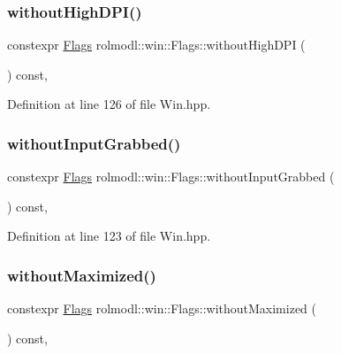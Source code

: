 \subsubsection{\texorpdfstring{withoutHighDPI()}{withoutHighDPI()}}
{\footnotesize\ttfamily constexpr \mbox{\hyperlink{structrolmodl_1_1win_1_1_flags}{Flags}} rolmodl\+::win\+::\+Flags\+::without\+High\+D\+PI (\begin{DoxyParamCaption}{ }\end{DoxyParamCaption}) const\hspace{0.3cm}{\ttfamily [inline]}, {\ttfamily [noexcept]}}



Definition at line 126 of file Win.\+hpp.

\mbox{\label{structrolmodl_1_1win_1_1_flags_a2e21e22deaf66fbd81b3f447df8f5668}} 
\subsubsection{\texorpdfstring{withoutInputGrabbed()}{withoutInputGrabbed()}}
{\footnotesize\ttfamily constexpr \mbox{\hyperlink{structrolmodl_1_1win_1_1_flags}{Flags}} rolmodl\+::win\+::\+Flags\+::without\+Input\+Grabbed (\begin{DoxyParamCaption}{ }\end{DoxyParamCaption}) const\hspace{0.3cm}{\ttfamily [inline]}, {\ttfamily [noexcept]}}



Definition at line 123 of file Win.\+hpp.

\mbox{\label{structrolmodl_1_1win_1_1_flags_a5abe47926362ee129a2c5e0c1efc70fc}} 
\subsubsection{\texorpdfstring{withoutMaximized()}{withoutMaximized()}}
{\footnotesize\ttfamily constexpr \mbox{\hyperlink{structrolmodl_1_1win_1_1_flags}{Flags}} rolmodl\+::win\+::\+Flags\+::without\+Maximized (\begin{DoxyParamCaption}{ }\end{DoxyParamCaption}) const\hspace{0.3cm}{\ttfamily [inline]}, {\ttfamily [noexcept]}}



